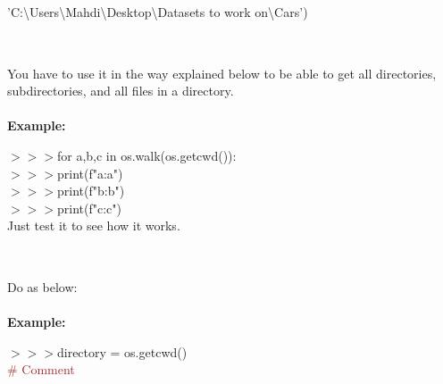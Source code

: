\documentclass[a4paper,18pt]{article}
\begin{document}
\hspace{14pt} 'C:\textbackslash Users\textbackslash Mahdi\textbackslash Desktop\textbackslash Datasets to work on\textbackslash Cars')\\\\


\subsection{\colorbox {matgreen}{\color{white}{\large os.walk}}}
You have to use it in the way explained below to be able to get all directories, subdirectories, and all files in a directory.\\\\
\textbf{Example:\\}



$>>>$for a,b,c in os.walk(os.getcwd()):\\

$>>>$\hspace*{28pt}print(f"a:{a}")\\

$>>>$\hspace*{28pt}print(f"b:{b}")\\

$>>>$\hspace*{28pt}print(f"c:{c}")\\

Just test it to see how it works.\\\\




\subsection{\colorbox {matgreen}{\color{white}{\large To Loop over files in a directory}}}
Do as below:\\\\
\textbf{Example:\\}

$>>>$directory = os.getcwd()\\{\textcolor{brown}{\# Comment}}\\
\end{document}
